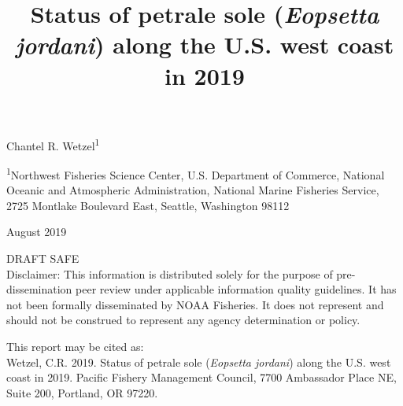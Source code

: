 \documentclass[12pt,]{article}
\title{Status of petrale sole (\emph{Eopsetta jordani}) along the U.S. west
coast in 2019}
\author{}
\date{}
\begin{document}
\maketitle


\begin{center}
\thispagestyle{empty}


\vspace{.5cm}




Chantel R. Wetzel\textsuperscript{1}\\


\vspace{.5cm}

\small
\textsuperscript{1}Northwest Fisheries Science Center, U.S. Department of Commerce, National Oceanic and Atmospheric Administration, National Marine Fisheries Service, 2725 Montlake Boulevard East, Seattle, Washington 98112\\

\vspace{.3cm}





\vspace{1cm}

\vfill
August 2019

\vspace{1cm}

DRAFT SAFE\\
Disclaimer: This information is distributed solely for the purpose of pre-dissemination
peer review under applicable information quality guidelines. It has not been formally
disseminated by NOAA Fisheries. It does not represent and should not be construed to
represent any agency determination or policy. 


\vspace{.3cm}

\newpage

\vspace{3cm}

This report may be cited as:\\

Wetzel, C.R. 2019. Status of petrale sole (\textit{Eopsetta jordani}) along the U.S. west coast in 2019. Pacific Fishery Management Council, 7700 Ambassador Place NE, Suite 200, Portland, OR 97220. 
\end{center}
\end{document}
